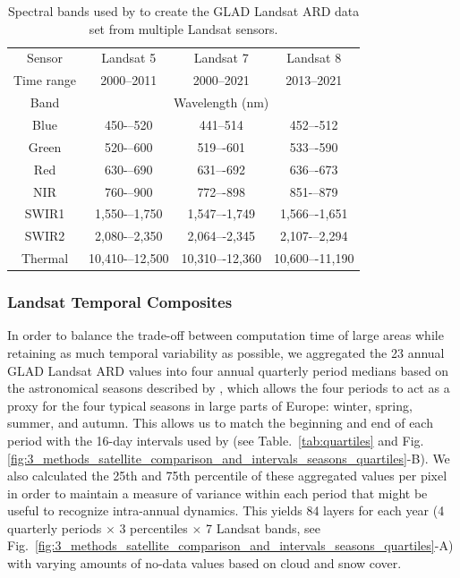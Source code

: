 \begin{table}[]
\centering
\caption{Spectral bands used by \citet{potapov2020landsat} to create the GLAD Landsat ARD data set from multiple Landsat sensors.}
\label{tab:landsat_sources}
\begin{tabular}{@{}cccc@{}}
\hline
Sensor & Landsat 5 & Landsat 7 & Landsat 8 \\ 
Time range                  & 2000--2011     & 2000--2021     & 2013--2021     \\
Band                        & \multicolumn{3}{c}{Wavelength (nm)}           \\ 
\hline
Blue                        & 450-–520       & 441--514       & 452–-512       \\
Green                       & 520-–600       & 519–-601       & 533–-590       \\
Red                         & 630-–690       & 631–-692       & 636–-673       \\
NIR          & 760-–900     & 772–-898       & 851-–879       \\
SWIR1                       & 1,550-–1,750   & 1,547–-1,749   & 1,566–-1,651   \\
SWIR2                       & 2,080-–2,350   & 2,064–-2,345   & 2,107-–2,294   \\
Thermal                     & 10,410-–12,500 & 10,310–-12,360 & 10,600–-11,190 \\ \hline
\end{tabular}
\end{table}
    
\subsubsection*{Landsat Temporal Composites}
\label{sec:landsat-temporal-composites}

In order to balance the trade-off between computation time of large areas while retaining as much temporal variability as possible, we aggregated the 23 annual GLAD Landsat ARD values into four annual quarterly period medians based on the astronomical seasons described by \citet{trenberth1983seasons}, which allows the four periods to act as a proxy for the four typical seasons in large parts of Europe: winter, spring, summer, and autumn. This allows us to match the beginning and end of each period with the 16-day intervals used by \citet{potapov2020landsat} (see Table.\@~\ref{tab:quartiles} and Fig.\@\ref{fig:3_methods_satellite_comparison_and_intervals_seasons_quartiles}-B). We also calculated the 25th and 75th percentile of these aggregated values per pixel in order to maintain a measure of variance within each period that might be useful to recognize intra-annual dynamics. This yields 84 layers for each year (4 quarterly periods $\times$ 3 percentiles $\times$ 7 Landsat bands, see Fig.\@~\ref{fig:3_methods_satellite_comparison_and_intervals_seasons_quartiles}-A) with varying amounts of no-data values based on cloud and snow cover.

